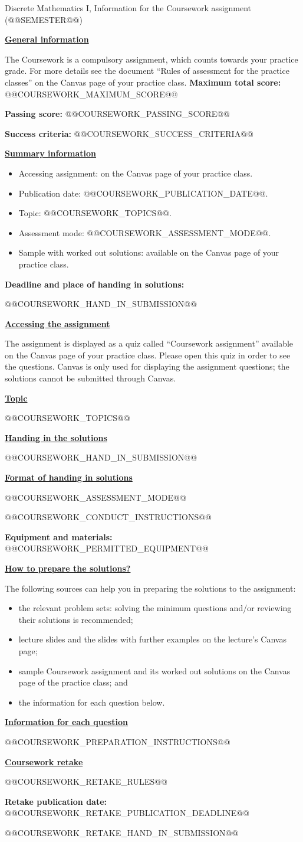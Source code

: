 \documentclass[11pt,a4paper]{article}
\newcommand{\heading}[1]{\par\medskip\textbf{\underline{#1}}\par}
\begin{document}
\begin{center}\large
Discrete Mathematics I, Information for the Coursework assignment\\
(@@SEMESTER@@)
\end{center}

\heading{General information}
The Coursework is a compulsory assignment, which counts towards your practice
grade. For more details see the document ``Rules of assessment for the practice
classes'' on the Canvas page of your practice class.
\textbf{Maximum total score:} @@COURSEWORK_MAXIMUM_SCORE@@\par
\textbf{Passing score:} @@COURSEWORK_PASSING_SCORE@@\par
\textbf{Success criteria:} @@COURSEWORK_SUCCESS_CRITERIA@@

\heading{Summary information}
\begin{itemize}
\item Accessing assignment: on the Canvas page of your practice class.
\item Publication date: @@COURSEWORK_PUBLICATION_DATE@@.
\item Topic: @@COURSEWORK_TOPICS@@.
\item Assessment mode: @@COURSEWORK_ASSESSMENT_MODE@@.
\item Sample with worked out solutions: available on the Canvas page of your practice class.
\end{itemize}
\textbf{Deadline and place of handing in solutions:}\par
@@COURSEWORK_HAND_IN_SUBMISSION@@

\heading{Accessing the assignment}
The assignment is displayed as a quiz called ``Coursework assignment'' available
on the Canvas page of your practice class. Please open this quiz in order to see
the questions. Canvas is only used for displaying the assignment questions;
the solutions cannot be submitted through Canvas.

\heading{Topic}
@@COURSEWORK_TOPICS@@

\heading{Handing in the solutions}
@@COURSEWORK_HAND_IN_SUBMISSION@@

\heading{Format of handing in solutions}
@@COURSEWORK_ASSESSMENT_MODE@@\par
@@COURSEWORK_CONDUCT_INSTRUCTIONS@@\par
\textbf{Equipment and materials:} @@COURSEWORK_PERMITTED_EQUIPMENT@@

\heading{How to prepare the solutions?}
The following sources can help you in preparing the solutions to the assignment:
\begin{itemize}
\item the relevant problem sets: solving the minimum questions and/or reviewing
their solutions is recommended;
\item lecture slides and the slides with further examples on the lecture's Canvas page;
\item sample Coursework assignment and its worked out solutions on the Canvas
page of the practice class; and
\item the information for each question below.
\end{itemize}

\heading{Information for each question}
@@COURSEWORK_PREPARATION_INSTRUCTIONS@@

\heading{Coursework retake}
@@COURSEWORK_RETAKE_RULES@@\par
\textbf{Retake publication date:} @@COURSEWORK_RETAKE_PUBLICATION_DEADLINE@@\par
@@COURSEWORK_RETAKE_HAND_IN_SUBMISSION@@
\end{document}
